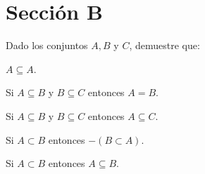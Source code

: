 \section{Sección B }
Dado los conjuntos $A,B$ y $C$, demuestre que: 

\begin{problema}
	$A\subseteq A$.
\end{problema}

\begin{problema}
	Si $A\subseteq B$ y $B\subseteq C$ entonces $A=B$.
\end{problema}

\begin{problema}
	Si $A\subseteq B$ y $B\subseteq C$ entonces $A\subseteq C$. 
\end{problema}

\begin{problema}
	Si  $A\subset B$ entonces $-(B\subset A)$.
\end{problema}

\begin{problema}
	Si $A\subset B$ entonces $A\subseteq B$. 
\end{problema}





